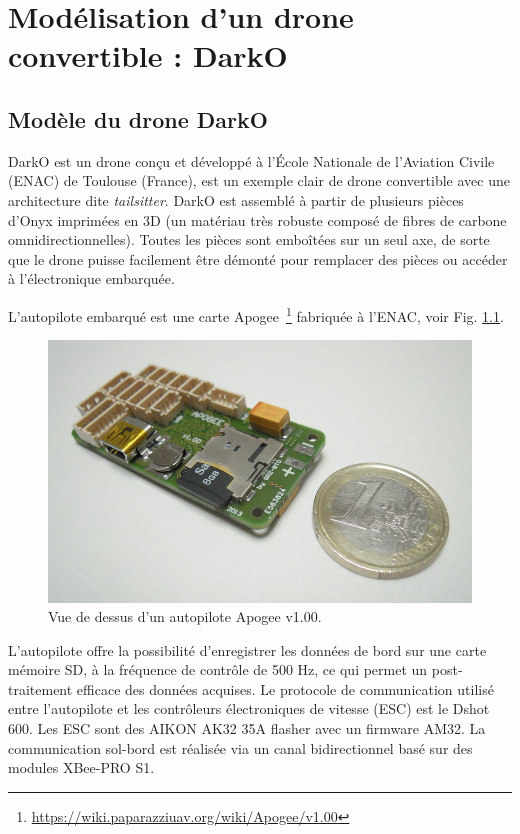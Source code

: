 \chapter{Modélisation d'un drone convertible : DarkO}
\minitoc
\label{chap:model}

\section{Modèle du drone DarkO}
\label{sec:model}
DarkO est un drone conçu et développé à l'École Nationale de l'Aviation Civile (ENAC) de Toulouse (France), est un exemple clair de drone convertible avec une architecture dite \textit{tailsitter}.
DarkO est assemblé à partir de plusieurs pièces d'Onyx imprimées en 3D (un matériau très robuste composé de fibres de carbone omnidirectionnelles). Toutes les pièces sont emboîtées sur un seul axe, de sorte que le drone puisse facilement être démonté pour remplacer des pièces ou accéder à l'électronique embarquée. 

L'autopilote embarqué est une carte Apogee~\footnote{\url{https://wiki.paparazziuav.org/wiki/Apogee/v1.00}} fabriquée à l'ENAC, voir Fig. \ref{fig:apogee}. 


\begin{figure}[ht!]
    \centering
        \includegraphics[width=0.8\columnwidth]{figures/800px-Apogee_v100_top_1E.jpeg}
        \caption{Vue de dessus d'un autopilote Apogee v1.00.}
        \label{fig:apogee}
\end{figure}

L'autopilote offre la possibilité d'enregistrer les données de bord sur une carte mémoire SD, à la fréquence de contrôle de 500 Hz, ce qui permet un post-traitement efficace des données acquises. Le protocole de communication utilisé entre l'autopilote et les contrôleurs électroniques de vitesse (ESC) est le Dshot 600. Les ESC sont des AIKON AK32 35A  flasher avec un firmware AM32. La communication sol-bord est réalisée via un canal bidirectionnel basé sur des modules XBee-PRO S1.

